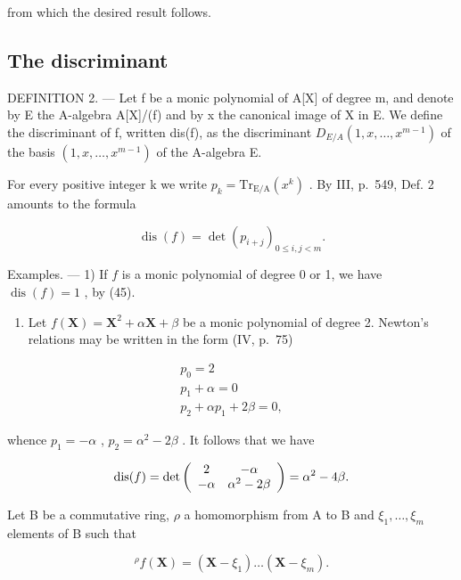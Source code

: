 from which the desired result follows.

\subsection{The discriminant}

DEFINITION 2. --- Let f be a monic polynomial of A{[}X{]} of degree m, and denote by E the A-algebra A{[}X{]}/(f) and by x the canonical image of X in E. We define the discriminant of f, written dis(f), as the discriminant \(D_{E/A}(1, x, \ldots, x^{m-1})\) of the basis \((1, x, \ldots, x^{m-1})\) of the A-algebra E.

For every positive integer k we write \(p_{k} = \mathrm{Tr}_{\mathrm{E}/\mathrm{A}}(x^{k})\) . By III, p.~549, Def. 2 amounts to the formula

\[
\operatorname{dis} (f) = \det \left(p _ {i + j}\right) _ {0 \leqslant i, j <   m}.\tag{45}
\]

Examples. --- 1) If \(f\) is a monic polynomial of degree 0 or 1, we have \(\operatorname{dis}(f) = 1\) , by (45).

\begin{enumerate}
\def\labelenumi{\arabic{enumi})}
\setcounter{enumi}{1}
\tightlist
\item
  Let \(f(\mathbf{X}) = \mathbf{X}^2 + \alpha \mathbf{X} + \beta\) be a monic polynomial of degree 2. Newton's relations may be written in the form (IV, p.~75)
\end{enumerate}

\[
\begin{array}{c} p _ {0} = 2 \\ p _ {1} + \alpha = 0 \\ p _ {2} + \alpha p _ {1} + 2 \beta = 0, \end{array}
\]

whence \(p_1 = -\alpha\) , \(p_2 = \alpha^2 - 2\beta\) . It follows that we have

\[
\operatorname{dis} (f) = \det \left( \begin{array}{c c} 2 & - \alpha \\ - \alpha & \alpha^ {2} - 2 \beta \end{array} \right) = \alpha^ {2} - 4 \beta .
\]

Let B be a commutative ring, \(\rho\) a homomorphism from A to B and \(\xi_{1}, \ldots, \xi_{m}\) elements of B such that

\[
{ } ^ { \rho } f ( \mathbf { X } ) = ( \mathbf { X } - \xi _ { 1 } ) \dots ( \mathbf { X } - \xi _ { m } ) .
\]

